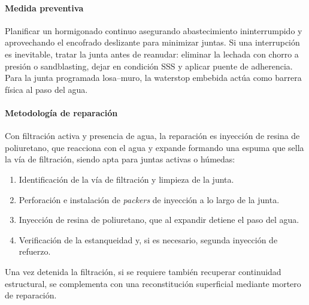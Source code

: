 \paragraph{Medida preventiva}
Planificar un hormigonado continuo asegurando abastecimiento ininterrumpido y aprovechando el encofrado deslizante para minimizar juntas. Si una interrupción es inevitable, tratar la junta antes de reanudar: eliminar la lechada con chorro a presión o sandblasting, dejar en condición SSS y aplicar puente de adherencia. Para la junta programada losa--muro, la waterstop embebida actúa como barrera física al paso del agua.

\paragraph{Metodología de reparación}
Con filtración activa y presencia de agua, la reparación es inyección de resina de poliuretano, que reacciona con el agua y expande formando una espuma que sella la vía de filtración, siendo apta para juntas activas o húmedas:
\begin{enumerate}
    \item Identificación de la vía de filtración y limpieza de la junta.
    \item Perforación e instalación de \textit{packers} de inyección a lo largo de la junta.
    \item Inyección de resina de poliuretano, que al expandir detiene el paso del agua.
    \item Verificación de la estanqueidad y, si es necesario, segunda inyección de refuerzo.
\end{enumerate}
Una vez detenida la filtración, si se requiere también recuperar continuidad estructural, se complementa con una reconstitución superficial mediante mortero de reparación.
